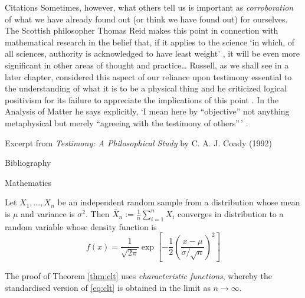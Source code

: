 \documentclass[,aspectratio=43]{beamer}
\begin{document}
\begin{frame}{Citations}
\protect\hypertarget{citations}{}
Sometimes, however, what others tell us is important as
\emph{corroboration} of what we have already found out (or think we have
found out) for ourselves. The Scottish philosopher Thomas Reid makes
this point in connection with mathematical research in the belief that,
if it applies to the science `in which, of all sciences, authority is
acknowledged to have least weight' \cite{reid2002thomas}, it will be
even more significant in other areas of thought and practice\ldots{}
Russell, as we shall see in a later chapter, considered this aspect of
our reliance upon testimony essential to the understanding of what it is
to be a physical thing and he criticized logical positivism for its
failure to appreciate the implications of this point
\cite{russell2007logic}. In the Analysis of Matter he says explicitly,
`I mean here by ``objective'' not anything metaphysical but merely
``agreeing with the testimony of others''\,' \cite{russell2015analysis}.

\vspace{1em}

Excerpt from \emph{Testimony: A Philosophical Study} by C. A. J. Coady
(1992)
\end{frame}

\begin{frame}{Bibliography}
\protect\hypertarget{bibliography}{}
\nocite{coady1992testimony} \printbibliography[heading=none]
\end{frame}

\begin{frame}{Mathematics}
\protect\hypertarget{mathematics}{}
\begin{theorem}
\label{thm:clt} Let \(X_1,\dots,X_n\) be an independent random sample
from a distribution whose mean is \(\mu\) and variance is \(\sigma^2\).
Then \(\bar X_n := \frac{1}{n}\sum_{i=1}^n X_i\) converges in
distribution to a random variable whose density function is
\begin{equation}
\label{eq:clt}
f(x) = \frac{1}{\sqrt{2\pi}} \exp\left[ -\frac{1}{2}\left(\frac{x - \mu}{\sigma/\sqrt n} \right)^2 \right]
\end{equation}
\end{theorem}

The proof of Theorem \ref{thm:clt} uses \emph{characteristic functions},
whereby the standardised version of \eqref{eq:clt} is obtained in the
limit as \(n\to\infty\).
\end{frame}
\end{document}
